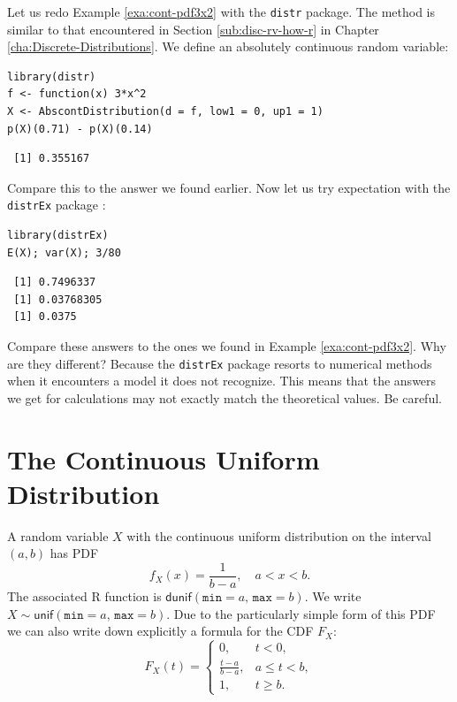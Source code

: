 \documentclass[captions=tableheading]{scrbook}
\begin{document}
\begin{example}
Let us redo Example \ref{exa:cont-pdf3x2} with the \texttt{distr} package. The method is similar to that encountered in Section \ref{sub:disc-rv-how-r} in Chapter \ref{cha:Discrete-Distributions}. We define an absolutely continuous random variable:



\begin{verbatim}
library(distr)
f <- function(x) 3*x^2
X <- AbscontDistribution(d = f, low1 = 0, up1 = 1)
p(X)(0.71) - p(X)(0.14)
\end{verbatim}

\begin{verbatim}
 [1] 0.355167
\end{verbatim}

Compare this to the answer we found earlier. Now let us try expectation with the \texttt{distrEx} package \cite{Ruckdescheldistr}:

\begin{verbatim}
library(distrEx)
E(X); var(X); 3/80
\end{verbatim}

\begin{verbatim}
 [1] 0.7496337
 [1] 0.03768305
 [1] 0.0375
\end{verbatim}

Compare these answers to the ones we found in Example \ref{exa:cont-pdf3x2}. Why are they different? Because the \texttt{distrEx} package resorts to numerical methods when it encounters a model it does not recognize. This means that the answers we get for calculations may not exactly match the theoretical values. Be careful.
\end{example}
\section{The Continuous Uniform Distribution}
\label{sec-6-2}

\label{sec:The-Continuous-Uniform}

A random variable \(X\) with the continuous uniform distribution on the interval \((a,b)\) has PDF
\begin{equation}
f_{X}(x)=\frac{1}{b-a},\quad a<x<b.
\end{equation}
The associated \textsf{R} function is \(\mathsf{dunif}(\mathtt{min}=a,\,\mathtt{max}=b)\). We write \(X\sim\mathsf{unif}(\mathtt{min}=a,\,\mathtt{max}=b)\). Due to the particularly simple form of this PDF we can also write down explicitly a formula for the CDF \(F_{X}\):
\begin{equation}
F_{X}(t)=
\begin{cases}
0, & t<0,\\
\frac{t-a}{b-a}, & a\leq t<b,\\
1, & t\geq b.
\end{cases}
\label{eq:unif-cdf}
\end{equation}
\end{document}
